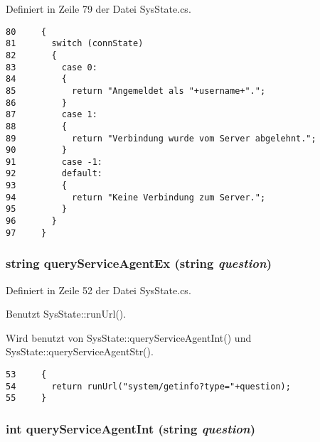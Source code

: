 Definiert in Zeile 79 der Datei Sys\-State.cs.



\footnotesize\begin{verbatim}80     {
81       switch (connState)
82       {
83         case 0:
84         {
85           return "Angemeldet als "+username+".";
86         }
87         case 1:
88         {
89           return "Verbindung wurde vom Server abgelehnt.";
90         }
91         case -1:
92         default:
93         {
94           return "Keine Verbindung zum Server.";
95         }
96       }
97     }
\end{verbatim}\normalsize 
\hypertarget{classQbeSAS_1_1SysState_QbeSAS_1_1SysStatee3}{
\subsubsection[queryServiceAgentEx]{\setlength{\rightskip}{0pt plus 5cm}string query\-Service\-Agent\-Ex (string {\em question})}}
\label{classQbeSAS_1_1SysState_QbeSAS_1_1SysStatee3}




Definiert in Zeile 52 der Datei Sys\-State.cs.

Benutzt Sys\-State::run\-Url().

Wird benutzt von Sys\-State::query\-Service\-Agent\-Int() und Sys\-State::query\-Service\-Agent\-Str().



\footnotesize\begin{verbatim}53     {
54       return runUrl("system/getinfo?type="+question);
55     }
\end{verbatim}\normalsize 
\hypertarget{classQbeSAS_1_1SysState_QbeSAS_1_1SysStatee5}{
\subsubsection[queryServiceAgentInt]{\setlength{\rightskip}{0pt plus 5cm}int query\-Service\-Agent\-Int (string {\em question})}}
\label{classQbeSAS_1_1SysState_QbeSAS_1_1SysStatee5}




